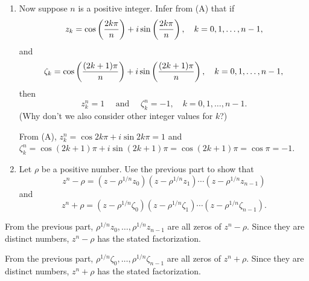 \documentclass{ximera}
\begin{document}
\begin{problem}
\begin{enumerate}
\item\label{exer:9.2.42e} %
Now suppose $n$ is a positive integer. Infer from (A)
that if
$$
z_k=\cos\left(2k\pi\over n\right)+i\sin\left(2k\pi\over n\right)
,\quad k=0,1,\dots,n-1,
$$
and
$$
\zeta_k=\cos\left((2k+1)\pi\over
n\right)+i\sin\left((2k+1)\pi\over n\right)
,\quad k=0,1,\dots,n-1,
$$
then
$$
z_k^n=1\quad\mbox{ and }\quad\zeta_k^n=-1,\quad k=0,1,\dots,n-1.
$$
(Why don't we also consider other integer values for $k$?)

\begin{solution}
From (A), $z_k^n=\cos2k\pi+i\sin2k\pi=1$ and
$\zeta_k^n=\cos(2k+1)\pi+i\sin(2k+1)\pi=\cos(2k+1)\pi=\cos\pi=-1$.
\end{solution}

\item %
Let $\rho$ be a positive number. Use the previous part to show that
$$
z^n-\rho=(z-\rho^{1/n} z_0)(z-\rho^{1/n}z_1)\cdots(z-\rho^{1/n} z_{n-1})
$$
and
$$
z^n+\rho=(z-\rho^{1/n} \zeta_0)(z-\rho^{1/n} \zeta_1)\cdots(z-\rho^{1/n}
\zeta_{n-1}).
$$
\end{enumerate}

\begin{solution}
From the previous part, $\rho^{1/n}z_0,\dots,\rho^{1/n}z_{n-1}$
are all zeros of $z^n-\rho$. Since they are distinct numbers,
$z^n-\rho$ has the stated factorization.

From the previous part, $\rho^{1/n}\zeta_0,\dots,\rho^{1/n}\zeta_{n-1}$
are all zeros of $z^n+\rho$. Since they are distinct numbers,
$z^n+\rho$ has the stated factorization.
\end{solution}
\end{problem}
\end{document}
